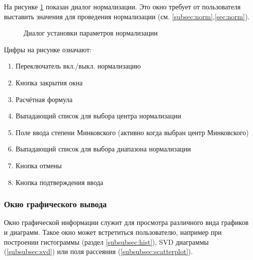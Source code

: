 \documentclass[12pt,tikz]{instruction}
\begin{document}
На рисунке \ref{fig:normdialog} показан диалог нормализации. Это окно требует от пользователя выставить значения для проведения нормализации (см. \ref{subsec:norm},\ref{sec:norm}). 
\begin{figure}[H]
	\centering
	\caption{Диалог установки параметров нормализации}
	\label{fig:normdialog}
\end{figure}
Цифры на рисунке означают:
\begin{enumerate}
	\item Переключатель вкл./выкл. нормализацию
	\item Кнопка закрытия окна
	\item Расчётная формула
	\item Выпадающий список для выбора центра нормализации
	\item Поле ввода степени Минковского (активно когда выбран центр Минковского)
	\item Выпадающий список для выбора диапазона нормализации
	\item Кнопка отмены
	\item Кнопка подтверждения ввода
\end{enumerate}

\subsubsection{Окно графического вывода}
\label{subsec:plot-view}
Окно графической информации служит для просмотра различного вида графиков и диаграмм. Такое окно может встретиться пользователю, например при построении гистограммы (раздел \ref{subsubsec:hist}), SVD диаграммы (\ref{subsubsec:svd}) или поля рассеяния (\ref{subsubsec:scatterplot}).
\end{document}
